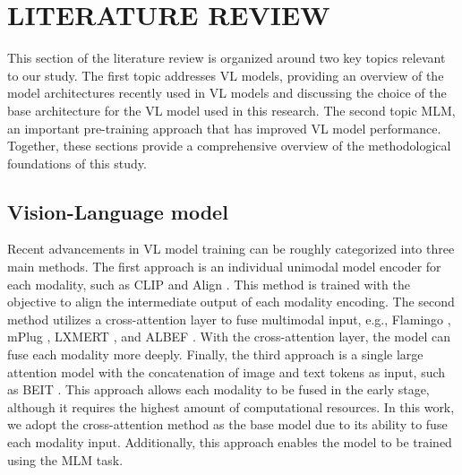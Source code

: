 \chapter{LITERATURE REVIEW}
This section of the literature review is organized around two key topics relevant to our study.
The first topic addresses VL models, providing an overview of the model architectures recently used in VL models and discussing the choice of the base architecture for the VL model used in this research.
The second topic MLM, an important pre-training approach that has improved VL model performance.
Together, these sections provide a comprehensive overview of the methodological foundations of this study.

\section{Vision-Language model}
Recent advancements in VL model training can be roughly categorized into three main methods. 
The first approach is an individual unimodal model encoder for each modality, such as CLIP \cite{clip} and Align \cite{align}.
This method is trained with the objective to align the intermediate output of each modality encoding. 
The second method utilizes a cross-attention layer to fuse multimodal input, e.g., Flamingo \cite{flamingo}, mPlug \cite{mplug}, LXMERT \cite{lxmert}, and ALBEF \cite{albef}. 
With the cross-attention layer, the model can fuse each modality more deeply. 
Finally, the third approach is a single large attention model with the concatenation of image and text tokens as input, such as BEIT \cite{beit-3}. 
This approach allows each modality to be fused in the early stage, although it requires the highest amount of computational resources.
In this work, we adopt the cross-attention method as the base model due to its ability to fuse each modality input.
Additionally, this approach enables the model to be trained using the MLM task.



